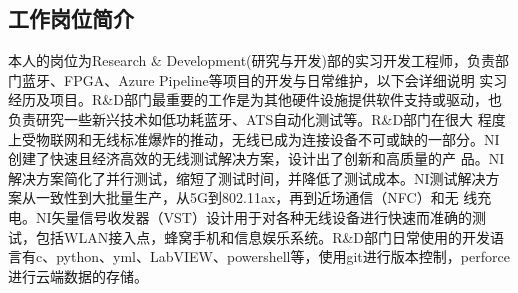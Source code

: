 \documentclass[UTF8]{ctexart}
\begin{document}
\subsection{工作岗位简介}
本人的岗位为Research \& Development(研究与开发)部的实习开发工程师，负责部门蓝牙、FPGA、Azure Pipeline等项目的开发与日常维护，以下会详细说明
实习经历及项目。R\&D部门最重要的工作是为其他硬件设施提供软件支持或驱动，也负责研究一些新兴技术如低功耗蓝牙、ATS自动化测试等。R\&D部门在很大
程度上受物联网和无线标准爆炸的推动，无线已成为连接设备不可或缺的一部分。NI创建了快速且经济高效的无线测试解决方案，设计出了创新和高质量的产
品。NI解决方案简化了并行测试，缩短了测试时间，并降低了测试成本。NI测试解决方案从一致性到大批量生产，从5G到802.11ax，再到近场通信（NFC）和无
线充电。NI矢量信号收发器（VST）设计用于对各种无线设备进行快速而准确的测试，包括WLAN接入点，蜂窝手机和信息娱乐系统。R\&D部门日常使用的开发语
言有c、python、yml、LabVIEW、powershell等，使用git进行版本控制，perforce进行云端数据的存储。
\end{document}

